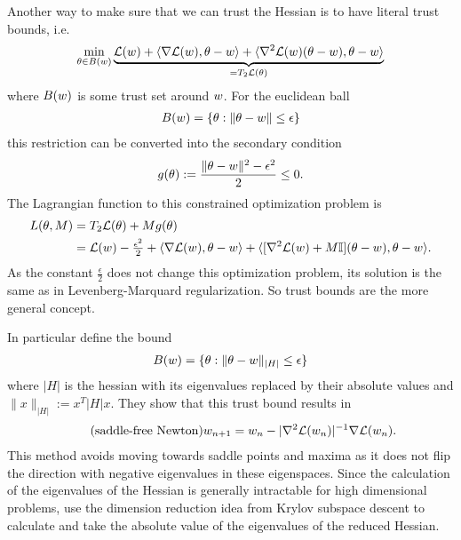 Another way to make sure that we can trust the Hessian is to have literal trust
bounds, i.e.
\begin{align*}
	\min_{ \theta\in B(w) }
	\underbrace{
		\mathcal{L}(w)
		+ \langle \nabla\mathcal{L}(w), \theta-w\rangle
		+ \langle \nabla^2\mathcal{L}(w)(\theta-w), \theta-w\rangle
	}_{= T_2\mathcal{L}(\theta)}
\end{align*}
where \(B(w)\) is some trust set around \(w\). For the euclidean
ball
\begin{align*}
	B(w) = \{ \theta : \|\theta - w\| \le \epsilon\}
\end{align*}
this restriction can be converted into the secondary condition
\begin{align*}
	g(\theta) := \frac{\|\theta - w\|^2 - \epsilon^2}{2} \le 0.
\end{align*}
The Lagrangian function to this constrained optimization problem is
\begin{align*}
	L(\theta, M) 
	&= T_2\mathcal{L}(\theta) + M g(\theta)\\
	&= \mathcal{L}(w) -\tfrac{\epsilon^2}{2}
	+ \langle \nabla\mathcal{L}(w), \theta-w\rangle
	+ \langle [\nabla^2\mathcal{L}(w) + M\mathbb{I}](\theta-w), \theta-w\rangle.
\end{align*}
As the constant \(\frac{\epsilon}2\) does not change this optimization problem,
its solution is the same as in Levenberg-Marquard regularization. So trust
bounds are the more general concept.

In particular \textcite{dauphinIdentifyingAttackingSaddle2014} define the bound
\begin{align*}
	B(w) = \{ \theta : \|\theta-w\|_{|H|} \le \epsilon\}
\end{align*}
where \(|H|\) is the hessian with its eigenvalues replaced by their absolute values
and \(\|x\|_{|H|}:= x^T |H| x\). They show that this trust bound results in
\begin{align*}
	\tag{saddle-free Newton}
	w_{n+1}	= w_n - |\nabla^2\mathcal{L}(w_n)|^{-1}\nabla\mathcal{L}(w_n).
\end{align*}
This method avoids moving towards saddle points and maxima as it does not flip
the direction with negative eigenvalues in these eigenspaces. Since the
calculation of the eigenvalues of the Hessian is generally intractable for
high dimensional problems, \textcite{dauphinIdentifyingAttackingSaddle2014}
use the dimension reduction idea from Krylov subspace descent to calculate
and take the absolute value of the eigenvalues of the reduced Hessian.


